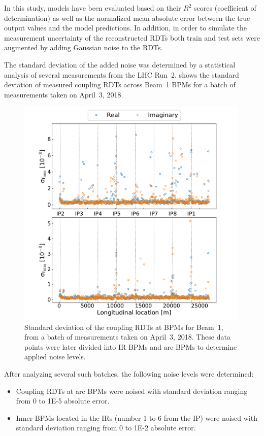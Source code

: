 In this study, models have been evaluated based on their \(R^2\) scores (coefficient of determination) as well as the normalized mean absolute error between the true output values and the model predictions.
In addition, in order to simulate the measurement uncertainty of the reconstructed RDTs both train and test sets were augmented by adding Gaussian noise to the RDTs.

The standard deviation of the added noise was determined by a statistical analysis of several measurements from the LHC Run~\num{2}.
 shows the standard deviation of measured coupling RDTs across Beam~\num{1} BPMs for a batch of measurements taken on April~\num{3}, \num{2018}.

\begin{figure}[!htb]
    \centering
    \includegraphics*[width=0.99\textwidth]{Figures/ML_for_IR_Coupling/ml_rdts_batch_stdev.pdf}
    \caption{Standard deviation of the coupling RDTs at BPMs for Beam~\num{1}, from a batch of measurements taken on April~\num{3}, \num{2018}. These data points were later divided into IR BPMs and arc BPMs to determine applied noise levels.}
    \label{figure:rdts_stdev_batch}
\end{figure}

After analyzing several such batches, the following noise levels were determined:
\begin{itemize}
  \item Coupling RDTs at arc BPMs were noised with standard deviation ranging from \num{0} to \num{1E-5} absolute error.
  \item Inner BPMs located in the IRs (number \num{1} to \num{6} from the IP) were noised with standard deviation ranging from \num{0} to \num{1E-2} absolute error.
\end{itemize}

